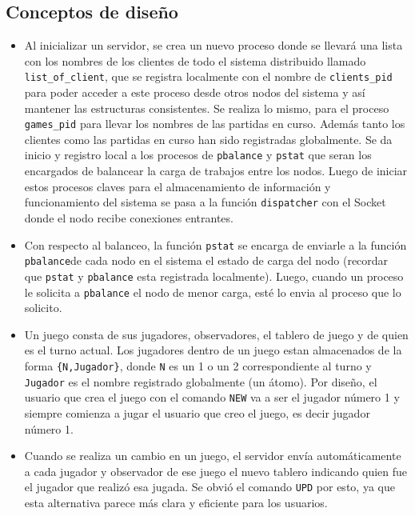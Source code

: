 \documentclass[a4paper]{article}
\newcommand{\blacktr}[0]{\item[$\blacktriangleright$]}
\begin{document}
\subsection*{Conceptos de diseño}
\begin{itemize}
  \blacktr Al inicializar un servidor, se crea un nuevo proceso donde se llevará una lista con los nombres de los clientes de todo el sistema distribuido llamado \texttt{list_of_client}, que se registra localmente con el nombre de \texttt{clients_pid} para poder acceder a este proceso desde otros nodos del sistema y así mantener las estructuras consistentes. Se realiza lo mismo, para el proceso \texttt{games_pid} para llevar los nombres de las partidas en curso. Además tanto los clientes como las partidas en curso han sido registradas globalmente. Se da inicio y registro local a los procesos de \texttt{pbalance} y \texttt{pstat} que seran los encargados de balancear la carga de trabajos entre los nodos. Luego de iniciar estos procesos claves para el almacenamiento de información y funcionamiento del sistema se pasa a la función \texttt{dispatcher} con el Socket donde el nodo recibe conexiones entrantes.%

  \blacktr Con respecto al balanceo, la función \texttt{pstat} se encarga de enviarle a la función \texttt{pbalance}de cada nodo en el sistema el estado de carga del nodo (recordar que \texttt{pstat} y \texttt{pbalance} esta registrada localmente). Luego, cuando un proceso le solicita a \texttt{pbalance} el nodo de menor carga, esté lo envia al proceso que lo solicito.%

  \blacktr Un juego consta de sus jugadores, observadores, el tablero de juego y de quien es el turno actual. Los jugadores dentro de un juego estan almacenados de la forma \texttt{\{N,Jugador\}}, donde \texttt{N} es un 1 o un 2 correspondiente al turno y \texttt{Jugador} es el nombre registrado globalmente (un átomo). Por diseño, el usuario que crea el juego con el comando \texttt{NEW} va a ser el jugador número 1 y siempre comienza a jugar el usuario que creo el juego, es decir jugador número 1.

  \blacktr Cuando se realiza un cambio en un juego, el servidor envía automáticamente a cada jugador y observador de ese juego el nuevo tablero indicando quien fue el jugador que realizó esa jugada. Se obvió el comando \texttt{UPD} por esto, ya que esta alternativa parece más clara y eficiente para los usuarios. 
\end{itemize}
\end{document}
